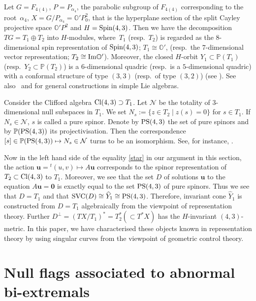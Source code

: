 \documentclass[pdftex]{sigma}
\numberwithin{equation}{section}
\theoremstyle{definition}
\newcommand{\PP}{\mathbb{P}}
\newcommand{\uuu}{\boldsymbol{u}}
\newcommand{\0}{\boldsymbol{0}}
\newcommand{\OO}{{\mathbb O}}
\newcommand{\Spin}{{\mbox {\rm Spin}}}
\newcommand{\SVC}{{\mbox {\rm SVC}}}
\begin{document}
\begin{Remark}
\label{Remark-representation-theory}
Let $G = F_{4(4)}$, $P = P_{\alpha_4}$, the parabolic subgroup of $F_{4(4)}$
corresponding to the root~$\alpha_4$,
$X = G/P_{\alpha_4} = \OO' P^2_0$, that is
the hyperplane section of the split Cayley projective space $\OO' P^2$ and $H = \Spin(4, 3)$.
Then we have the decomposition $TG = T_1\oplus T_2$ into $H$-modules, where~$T_1$ (resp.\ $T_2$)
is regarded as the $8$-dimensional spin representation of $\Spin(4, 3)$; $T_1 \cong \OO'$,
(resp.\ the $7$-dimensional vector representation; $T_2 \cong {\mbox{\rm {Im}}}\OO'$).
Moreover, the closed $H$-orbit $Y_1 \subset \PP(T_1)$ (resp.\ $Y_2 \subset \PP(T_2)$)
is a $6$-dimensional quadric (resp.\ is a $5$-dimensional quadric)
with a conformal structure of type $(3, 3)$ (resp.\ of type $(3, 2)$) (see \cite[Section~6.3]{LM}). See
also~\cite[Section~2]{LM} and \cite{BE, IL} for general constructions in simple Lie algebras.

Consider the Clifford algebra ${\mbox{\rm{Cl}}}(4,3) \supset T_1$.
Let ${\mathcal N}$ be the totality of $3$-dimensional null subspaces in $T_1$.
We set $N_s := \{ z \in T_2 \mid z(s) = 0\}$ for $s \in T_1$.
If $N_s \in {\mathcal N}$, $s$ is called a pure spinor. Denote by ${\rm PS}(4, 3)$
the set of pure spinors and by $\PP({\rm PS}(4, 3))$ its projectivisation. Then the correspondence $[s] \in \PP({\rm PS}(4, 3)) \mapsto N_s \in {\mathcal N}$ turns to be an isomorphism. See, for instance, \cite[p.~241 and~p.~283]{Harvey}.

Now in the left hand side of the equality \eqref{star} in our argument in this section,
the action $\uuu = {}^t(u, v) \mapsto A\uuu$
corresponds to the spinor representation of $T_2 \subset {\mbox{\rm Cl}}(4, 3)$ to $T_1$.
Moreover, we see that the set $D$ of solutions
$\uuu$ to the equation $A\uuu = \0$
is exactly equal to the set ${\rm PS}(4, 3)$ of pure spinors.
Thus we see that $D = T_1$ and that {$\SVC(D) \cong \widehat{Y}_1 \cong {\rm PS}(4,3)$}.
Therefore, invariant cone $\widehat{Y}_1$ is constructed from $D = T_1$ algebraically from the viewpoint of
representation theory. Further
$D^\perp = (TX/T_1)^* = T_2^* (\subset T^*X)$ has the $H$-invariant $(4, 3)$-metric.
In this paper, we have characterised these objects known in representation theory by using singular curves
from the viewpoint of geometric control theory.
\end{Remark}

\section{Null flags associated to abnormal bi-extremals}
\label{Null-flags}
\end{document}

